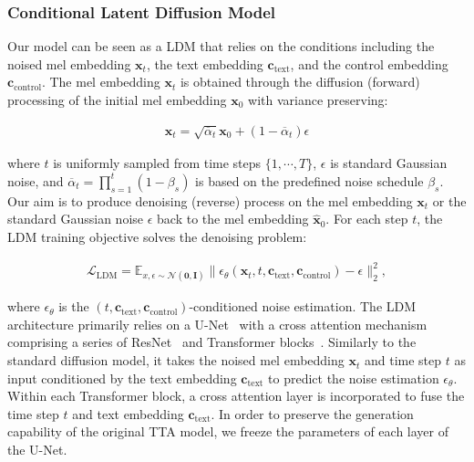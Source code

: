 \documentclass[letterpaper]{article}
\begin{document}
\subsubsection{Conditional Latent Diffusion Model} Our model can be seen as a LDM that relies on the conditions including the noised mel embedding $\mathbf{x}_{t}$, the text embedding $\mathbf{c}_{\text{text}}$, and the control embedding $\mathbf{c}_{\text{control}}$. The mel embedding $\mathbf{x}_{t}$ is obtained through the diffusion (forward) processing of the initial mel embedding $\mathbf{x}_{0}$ with variance preserving:

\begin{align}
\mathbf{x}_{t} = \sqrt{\overline\alpha_{t}} \mathbf{x}_{0} + (1-\overline\alpha_{t})\epsilon
\end{align}

where $t$ is uniformly sampled from time steps $\{1, \cdots, T\}$, $\epsilon$ is standard Gaussian noise, and $\overline\alpha_{t} = \prod_{s=1}^{t}(1 - \beta_{s})$ is based on the predefined noise schedule $\beta_{s}$. Our aim is to produce denoising (reverse) process on the mel embedding $\mathbf{x}_{t}$ or the standard Gaussian noise $\epsilon$ back to the mel embedding $\mathbf{\hat{x}}_0$. For each step $t$, the LDM training objective solves the denoising problem:

\begin{align}
\mathcal{L}_{\text{LDM}} = \mathbb{E}_{x, \epsilon \sim  \mathcal{N}(\mathbf{0}, \mathbf{I})}
\| \epsilon_{\theta}(\mathbf{x}_{t}, t, \mathbf{c}_{\text{text}}, \mathbf{c}_{\text{control}}) -   \epsilon \|^2_2,
\end{align}

where $\epsilon_{\theta}$ is the $(t, \mathbf{c}_{\text{text}}, \mathbf{c}_{\text{control}})$-conditioned noise estimation. The LDM architecture primarily relies on a U-Net~\cite{yang2022diffsound} with a cross attention mechanism~\cite{vaswani2017attention} comprising a series of ResNet~\cite{he2016resnet} and Transformer blocks~\cite{vaswani2017attention}. Similarly to the standard diffusion model, it takes the noised mel embedding $\mathbf{x}_{t}$ and time step $t$ as input conditioned by the text embedding $\mathbf{c}_{\text{text}}$ to predict the noise estimation $\epsilon_{\theta}$. Within each Transformer block, a cross attention layer is incorporated to fuse the time step $t$ and text embedding $\mathbf{c}_{\text{text}}$. In order to preserve the generation capability of the original TTA model, we freeze the parameters of each layer of the U-Net.
\end{document}

